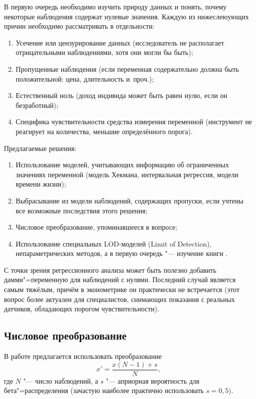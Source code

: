 \documentclass[final,pdftex]{../../template/epsilonj}
\begin{document}
В первую очередь необходимо изучить природу данных и понять, почему некоторые наблюдения содержат нулевые значения. Каждую из нижеслеюующих причин необходимо рассматривать в отдельности:
\begin{enumerate}
	\item Усечение или цензурирование данных (исследователь не располагает отрицательными наблюдениями, хотя они могли бы быть);
	\item Пропущенные наблюдения (если переменная содержательно должна быть положительной: цена, длительность и~проч.);
	\item Естественный ноль (доход индивида может быть равен нулю, если он безработный);
	\item Специфика чувствительности средства измерения переменной (инструмент не реагирует на количества, меньшие определённого порога).
\end{enumerate}

Предлагаемые решения:
\begin{enumerate}
	\item Использование моделей, учитывающих информацию об ограниченных значениях переменной (модель Хекмана, интервальная регрессия, модели времени жизни);
	\item Выбрасывание из модели наблюдений, содержащих пропуски, если учтены все возможные последствия этого решения;
	\item Числовое преобразование, упоминавшееся в вопросе;
	\item Использование специальных LOD-моделей (Limit of Detection), непараметрических методов, а в первую очередь "--- изучение книги \citep{nondetect05}.
\end{enumerate}

С точки зрения регрессионного анализа может быть полезно добавить дамми"=переменную для наблюдений с нулями. Последний случай является самым тяжёлым, причём в эконометрике он практически не встречается (этот вопрос более актуален для специалистов, снимающих показания с реальных датчиков, обладающих порогом чувствительности).

\subsection{Числовое преобразование}

В работе \citep{squeezer06} предлагается использовать преобразование 
\begin{equation}
	x' = \frac{x(N-1) + s}{N},
\end{equation}
где $N$ "--- число наблюдений, а $s$ "--- априорная вероятность для бета"=распределения (зачастую наиболее практично использовать $s=0{,}5$). 
\end{document}
